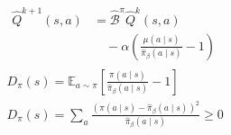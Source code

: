 \documentclass[border=7pt]{standalone}
\begin{document}
\color{ink}
$\displaystyle \begin{gathered}\begin{aligned}\widehat Q^{k+1}(s,a)&=\widehat{\mathcal B}^{\pi}\widehat Q^k(s,a)\\ &\quad-\alpha\!\left(\frac{\mu(a\mid s)}{\widehat\pi_\beta(a\mid s)}-1\right)\end{aligned}\\ D_\pi(s)=\mathbb E_{a\sim\pi}\!\left[\frac{\pi(a\mid s)}{\widehat\pi_\beta(a\mid s)}-1\right]\\ D_\pi(s)=\sum_a\frac{(\pi(a\mid s)-\widehat\pi_\beta(a\mid s))^2}{\widehat\pi_\beta(a\mid s)}\geq0\end{gathered}$
\end{document}
